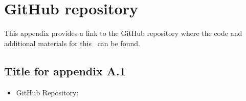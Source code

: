 

\chapter{GitHub repository}

This appendix provides a link to the GitHub repository where the code and additional materials for this \documenttype\ can be found.

\section{Title for appendix A.1}

\begin{itemize}
    \item GitHub Repository: \gitrepo
\end{itemize}


